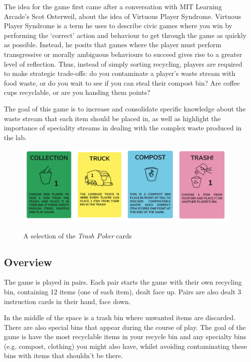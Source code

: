 \documentclass[nofonts,nols,justified,nobib]{tufte-book}
\begin{document}

The idea for the game first came after a conversation with MIT Learning Arcade's Scot Osterweil, about the idea of Virtuous Player Syndrome. Virtuous Player Syndrome is a term he uses to describe civic games where you win by performing the `correct' action and behaviour to get through the game as quickly as possible. Instead, he posits that games where the player must perform transgressive or morally ambiguous behaviours to succeed gives rise to a greater level of reflection. Thus, instead of simply sorting recycling, players are required to make strategic trade-offs: do you contaminate a player's waste stream with food waste, or do you wait to see if you can steal their compost bin? Are coffee cups recyclable, or are you handing them points?

The goal of this game is to increase and consolidate specific knowledge about the waste stream that each item should be placed in, as well as highlight the importance of speciality streams in dealing with the complex waste produced in the lab.

\begin{figure}
  \caption{A selection of the \emph{Trash Poker} cards}
  \includegraphics[width=1\linewidth]{img/3/trashpoker.png}
  \label{contamination}
\end{figure}

\subsection*{Overview}

The game is played in pairs. Each pair starts the game with their own recycling bin, containing 12 items (one of each item), dealt face up. Pairs are also dealt 3 instruction cards in their hand, face down. 

In the middle of the space is a trash bin where unwanted items are discarded. There are also special bins that appear during the course of play. 
The goal of the game is have the most recyclable items in your recycle bin and any specialty bins (e.g. compost, clothing) you might also have, whilst avoiding contaminating these bins with items that shouldn't be there. 
\end{document}
